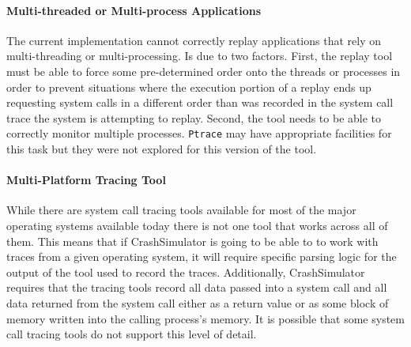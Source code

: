        \paragraph{Multi-threaded or Multi-process Applications}

        The current implementation cannot correctly replay applications that rely on multi-threading or
        multi-processing.  Is due to two factors.  First, the replay tool must be able to force some pre-determined
        order onto the threads or processes in order to prevent situations where the execution portion of a replay ends
        up requesting system calls in a different order than was recorded in the system call trace the system is
        attempting to replay.  Second, the tool needs to be able to correctly monitor multiple processes. {\tt Ptrace}
        may have appropriate facilities for this task but they were not explored for this version of the tool.

        \paragraph{Multi-Platform Tracing Tool}

        While there are system call tracing tools available for most of the major operating systems available today
        there is not one tool that works across all of them.  This means that if CrashSimulator is going to be able to
        to work with traces from a given operating system, it will require specific parsing logic for the output of the
        tool used to record the traces.  Additionally, CrashSimulator requires that the tracing tools record all data
        passed into a system call and all data returned from the system call either as a return value or as some block
        of memory written into the calling process's memory.  It is possible that some system call tracing tools do not
        support this level of detail.

